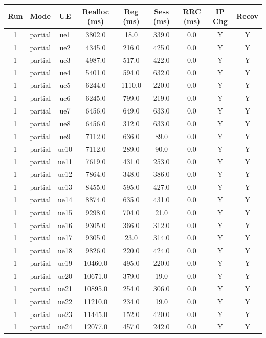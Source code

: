 \begin{table}[ht]
\centering
\begin{tabular}{|c|c|c|c|c|c|c|c|c|}
\hline
Run & Mode & UE & Realloc (ms) & Reg (ms) & Sess (ms) & RRC (ms) & IP Chg & Recov \\
\hline
1 & partial & ue1 & 3802.0 & 18.0 & 339.0 & 0.0 & Y & Y \\
1 & partial & ue2 & 4345.0 & 216.0 & 425.0 & 0.0 & Y & Y \\
1 & partial & ue3 & 4987.0 & 517.0 & 422.0 & 0.0 & Y & Y \\
1 & partial & ue4 & 5401.0 & 594.0 & 632.0 & 0.0 & Y & Y \\
1 & partial & ue5 & 6244.0 & 1110.0 & 220.0 & 0.0 & Y & Y \\
1 & partial & ue6 & 6245.0 & 799.0 & 219.0 & 0.0 & Y & Y \\
1 & partial & ue7 & 6456.0 & 649.0 & 633.0 & 0.0 & Y & Y \\
1 & partial & ue8 & 6456.0 & 312.0 & 633.0 & 0.0 & Y & Y \\
1 & partial & ue9 & 7112.0 & 636.0 & 89.0 & 0.0 & Y & Y \\
1 & partial & ue10 & 7112.0 & 289.0 & 90.0 & 0.0 & Y & Y \\
1 & partial & ue11 & 7619.0 & 431.0 & 253.0 & 0.0 & Y & Y \\
1 & partial & ue12 & 7864.0 & 348.0 & 386.0 & 0.0 & Y & Y \\
1 & partial & ue13 & 8455.0 & 595.0 & 427.0 & 0.0 & Y & Y \\
1 & partial & ue14 & 8874.0 & 635.0 & 431.0 & 0.0 & Y & Y \\
1 & partial & ue15 & 9298.0 & 704.0 & 21.0 & 0.0 & Y & Y \\
1 & partial & ue16 & 9305.0 & 366.0 & 312.0 & 0.0 & Y & Y \\
1 & partial & ue17 & 9305.0 & 23.0 & 314.0 & 0.0 & Y & Y \\
1 & partial & ue18 & 9826.0 & 220.0 & 424.0 & 0.0 & Y & Y \\
1 & partial & ue19 & 10460.0 & 495.0 & 220.0 & 0.0 & Y & Y \\
1 & partial & ue20 & 10671.0 & 379.0 & 19.0 & 0.0 & Y & Y \\
1 & partial & ue21 & 10895.0 & 254.0 & 306.0 & 0.0 & Y & Y \\
1 & partial & ue22 & 11210.0 & 234.0 & 19.0 & 0.0 & Y & Y \\
1 & partial & ue23 & 11445.0 & 152.0 & 420.0 & 0.0 & Y & Y \\
1 & partial & ue24 & 12077.0 & 457.0 & 242.0 & 0.0 & Y & Y \\

\end{tabular}
\end{table}
